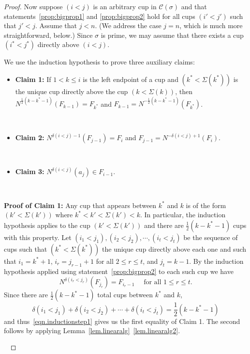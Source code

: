\documentclass[11pt]{amsart}
\theoremstyle{remark}
\theoremstyle{remark}
\theoremstyle{definition}
\theoremstyle{definition}
\theoremstyle{definition}
\numberwithin{equation}{section}
\newcommand{\gd}{\delta}
\newcommand{\gs}{\sigma}
\newcommand{\cc}{\mathcal{C}}
\newcommand{\E}{\Sigma}
\newcommand{\cupsigma}{\cc(\gs)}
\begin{document}
\begin{proof}
Now suppose $(i<j)$ is an arbitrary cup in $\cupsigma$ and that statements~\eqref{prop:bigprop1} and \eqref{prop:bigprop2} hold for all cups $(i'<j')$ such that $j'<j$. Assume that $j<n$. (We address the case $j=n$, which is much more straightforward, below.) Since $\gs$ is prime, we may assume that there exists a cup $(i^*<j^*)$ directly above $(i<j)$. 


We use the induction hypothesis to prove three auxiliary claims:
\
\begin{itemize}
\item \textbf{Claim 1:} If $1<k\leq i$ is the left endpoint of a cup and $(k^*<\E(k^*))$ is the unique cup directly above the cup $(k<\E(k))$, then $N^{\frac{1}{2}(k-k^*-1)} (F_{k-1}) = F_{k^*}$ and $F_{k-1} =  N^{-\frac{1}{2}(k-k^*-1)}( F_{k^*})$.

\


\item \textbf{Claim 2:} $N^{\gd(i<j)-1}(F_{j-1}) = F_i$ and $F_{j-1} = N^{-\gd(i<j)+1}(F_i)$.

\

\item \textbf{Claim 3:} $N^{\gd(i<j)} (a_j)\in F_{i-1}$.
\end{itemize}

\

\textbf{Proof of Claim 1:} Any  cup that appears between $k^*$ and $k$ is of the form $(k'<\E(k'))$ where $k^*<k'<\E(k')<k$. In particular, the induction hypothesis applies to the cup $(k'<\E(k'))$ and there are $\frac{1}{2}(k-k^*-1)$ cups with this property. Let $(i_1<j_1),(i_2<j_2),\cdots,(i_t<j_t)$ be the sequence of cups such that $(k^*<\E(k^*))$ the unique cup directly above each one and such that $i_1= k^*+1$, $i_r= j_{r-1}+1$ for all $2\leq r \leq t$, and $j_t = k-1$. By the induction hypothesis applied using statement~\eqref{prop:bigprop2} to each such cup we have
\begin{equation}\label{eqn.inductionstep1}
N^{\delta(i_r<j_r)} (F_{j_r}) = F_{i_r-1}  \quad \text{ for all $1\leq r \leq t$}.
\end{equation}
Since there are $\frac{1}{2}(k-k^*-1)$ total cups between $k^*$ and $k$, 
\[
\delta(i_1<j_1)+\delta(i_2<j_2)+ \cdots + \delta(i_t<j_t) = \frac{1}{2}(k-k^*-1)
\]
and thus~\eqref{eqn.inductionstep1} gives us the first equality of Claim 1. The second follows by applying  Lemma~\ref{lem.linearalg}~\eqref{lem.linearalg2}. 

 


\


\end{proof}
\end{document}
